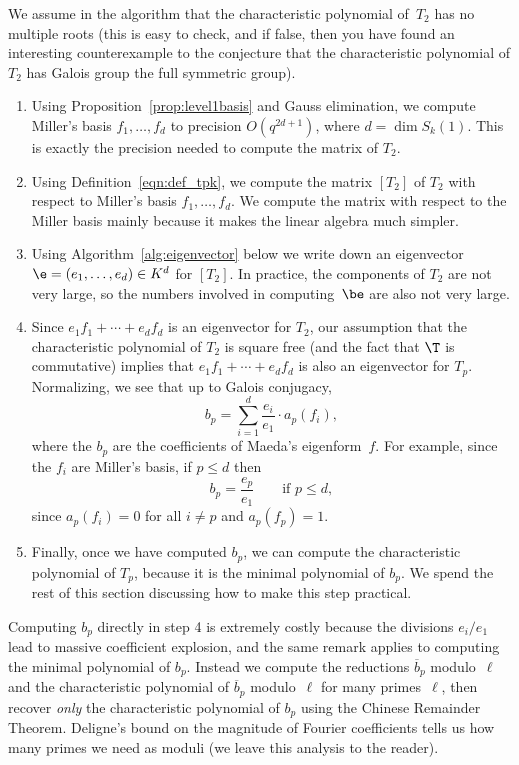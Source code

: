 \documentclass{report}
\begin{document}
\begin{algorithm}
We assume in the algorithm that the characteristic polynomial
of~$T_2$ has no multiple roots (this is easy to check, and if
false, then you have found an interesting counterexample to the
conjecture that the characteristic polynomial of $T_2$ has Galois
group the full symmetric group).
\begin{enumerate}
\item Using Proposition~\ref{prop:level1basis} and Gauss elimination,
we compute Miller's basis $f_1,\ldots, f_d$ to precision $O(q^{2d+1})$,
where $d=\dim S_k(1)$.  This is exactly the precision needed to compute
the matrix of $T_2$.
\item Using Definition~\ref{eqn:def_tpk}, we compute the matrix
  $[T_2]$ of $T_2$ with respect to Miller's basis $f_1,\ldots, f_d$.
We compute the matrix with respect to the Miller basis mainly because
it makes the linear algebra much simpler.
\item  Using Algorithm~\ref{alg:eigenvector} below we
write down an eigenvector $\e=(e_1,\ldots,e_d)\in K^d$ for $[T_2]$.
In practice, the components of $T_2$ are not very large,  so the numbers involved
in computing~$\be$ are also not very large.%
\item Since $e_1 f_1 + \cdots+ e_d f_d$ is an eigenvector for
$T_2$, our assumption that the characteristic polynomial of $T_2$
is square free (and the fact that $\T$ is commutative) implies
that $e_1 f_1 + \cdots + e_d f_d$ is also an eigenvector for
$T_p$. Normalizing, we see that up to Galois conjugacy,
\[
   b_p = \sum_{i=1}^d  \frac{e_i}{e_1}\cdot a_p(f_i),
\]
where the $b_p$ are the coefficients of Maeda's eigenform~$f$. For
example, since the $f_i$ are Miller's basis, if $p\leq d$ then
\[
b_p = \frac{e_p}{e_1}\qquad\text{if $p\leq d$},
\]
since $a_p(f_i)=0$ for all $i\neq p$ and $a_p(f_p)=1$.
\item Finally, once we
have computed $b_p$, we can compute the characteristic polynomial
of $T_p$, because it is the minimal polynomial of $b_p$.  We spend
the rest of this section discussing how to make this step
practical.
\end{enumerate}
\end{algorithm}

Computing $b_p$ directly in step 4 is extremely costly because the
divisions $e_i/e_1$ lead to massive coefficient explosion, and the
same remark applies to computing the minimal polynomial of $b_p$.
Instead we compute the reductions $\overline{b}_p$ modulo~$\ell$
and the  characteristic polynomial of $\overline{b}_p$
modulo~$\ell$ for many primes~$\ell$, then recover {\em only} the
characteristic polynomial of $b_p$ using the Chinese Remainder
Theorem. Deligne's bound on the magnitude of Fourier coefficients
tells us how many primes we need as moduli (we leave this
analysis to the reader).
\end{document}
